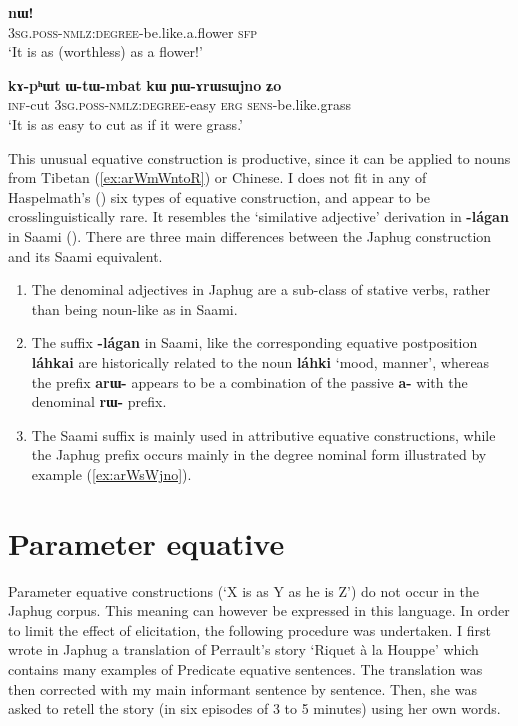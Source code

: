 \documentclass[oneside,a4paper,11pt]{article}
\newcommand{\ipa}[1]{{\phon\textbf{#1}}} %
\begin{document}
\begin{exe}
\ex \label{ex:arWmWntoR}
\gll \ipa{ɯ-tɯ-ɤrɯmɯntoʁ} 	\ipa{nɯ!}  \\
\textsc{3sg.poss-nmlz:degree}-be.like.a.flower \textsc{sfp} \\
\glt `It is as (worthless) as a flower!'
\end{exe}


\begin{exe}
\ex \label{ex:YArWsWjno}
\gll  
\ipa{kɤ-pʰɯt} 	\ipa{ɯ-tɯ-mbat} 	\ipa{kɯ} 	\ipa{ɲɯ-ɤrɯsɯjno} 	\ipa{ʑo} \\
\textsc{inf}-cut  \textsc{3sg.poss-nmlz:degree}-easy \textsc{erg} \textsc{sens}-be.like.grass \\
\glt `It is as easy to cut as if it were grass.' 
\end{exe}

This unusual equative construction is productive, since it can be applied to nouns from Tibetan (\ref{ex:arWmWntoR}) or Chinese. I does not fit in any of Haspelmath's (\citeyear{haspelmath17equative}) six types of equative construction, and appear to be crosslinguistically rare. It resembles the `similative adjective' derivation in \ipa{-lágan} in Saami (\citealt[5.1]{ylikovski17similarity}). There are three main differences between the Japhug construction and its Saami equivalent.

\begin{enumerate}
\item The denominal adjectives in Japhug are a sub-class of stative verbs, rather than being noun-like as in Saami.
\item The suffix \ipa{-lágan} in Saami, like the corresponding equative postposition \ipa{láhkai} are historically related to the noun \ipa{láhki} ‘mood, manner’, whereas the prefix \ipa{arɯ-} appears to be a combination of the passive \ipa{a-} with the denominal \ipa{rɯ-} prefix.
\item The Saami suffix is mainly used in attributive equative constructions, while the Japhug prefix occurs mainly in the degree nominal form illustrated by example (\ref{ex:arWsWjno}).
\end{enumerate}



\section{Parameter equative} \label{sec:pred.equative}
Parameter equative constructions (`X is as Y as he is Z') do not occur in the Japhug corpus. This meaning can however be expressed in this language. In order to limit the effect of elicitation, the following procedure was undertaken. I first wrote in Japhug a translation of Perrault's story `Riquet à la Houppe' which contains many examples of Predicate equative sentences. The translation was then corrected with my main informant sentence by sentence. Then, she was asked to retell the story (in six episodes of 3 to 5 minutes) using her own words.
\end{document}

